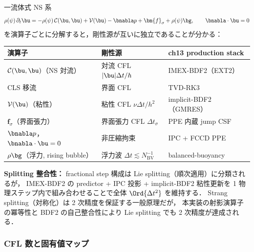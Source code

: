 一流体式 NS 系
\[
  \rho(\psi)\,\partial_t\bu
    = -\rho(\psi)\,\mathcal{C}(\bu,\bu)
    + \mathcal{V}(\bu) - \bnabla p + \bm{f}_\sigma + \rho(\psi)\bg,
  \qquad \bnabla\cdot\bu = 0
\]
を演算子ごとに分解すると，剛性源が互いに独立であることが分かる：

\begin{center}
\renewcommand{\arraystretch}{1.3}
\begin{tabular}{lll}
\hline
演算子 & 剛性源 & ch13 production stack \\
\hline
$\mathcal{C}(\bu,\bu)$（NS 対流） & 対流 CFL $|\bu|\Delta t/h$ & IMEX-BDF2（EXT2） \\
CLS 移流 & 界面 CFL & TVD-RK3 \\
$\mathcal{V}(\bu)$（粘性） & 粘性 CFL $\nu\Delta t/h^2$ & implicit-BDF2（GMRES） \\
$\bm{f}_\sigma$（界面張力） & 界面張力 CFL $\Delta t_\sigma$ & PPE 内蔵 jump CSF \\
$\bnabla p$，$\bnabla\cdot\bu=0$ & 非圧縮拘束 & IPC + FCCD PPE \\
$\rho\bg$（浮力, rising bubble） & 浮力波 $\Delta t \lesssim N_{\mathrm{BV}}^{-1}$ & balanced-buoyancy \\
\hline
\end{tabular}
\end{center}

\noindent\textbf{Splitting 整合性：}
fractional step 構成は Lie splitting（順次適用）に分類されるが，
IMEX-BDF2 の predictor + IPC 投影 + implicit-BDF2 粘性更新を
1 物理ステップ内で組み合わせることで全体 $\Ord{\Delta t^2}$ を維持する．
Strang splitting（対称化）は 2 次精度を保証する一般原理だが，
本実装の射影演算子の冪等性と BDF2 の自己整合性により
Lie splitting でも 2 次精度が達成される．

\subsubsection*{CFL 数と固有値マップ}
\label{sec:cfl_definitions}

